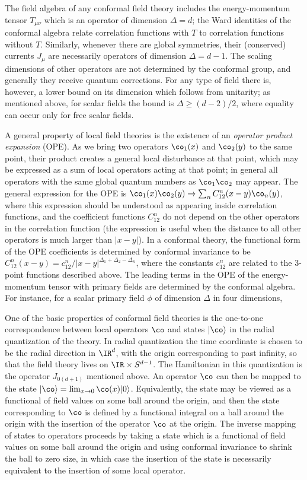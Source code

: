 The field algebra of any conformal field theory includes the
energy-momentum tensor $T_{\mu\nu}$ which is an operator of dimension
$\Delta=d$; the Ward identities of the conformal algebra relate
correlation functions with $T$ to correlation functions without
$T$. Similarly, whenever there are global symmetries, their
(conserved) currents $J_\mu$ are necessarily operators of dimension
$\Delta=d-1$. The scaling dimensions of other operators are not
determined by the conformal group, and generally they receive quantum
corrections. For any type of field there is, however, a lower bound on
its dimension which follows from unitarity; as mentioned above, for
scalar fields the bound is $\Delta \geq (d-2)/2$, where equality can
occur only for free scalar fields.

A general property of local field theories is the existence of an {\it
operator product expansion} (OPE). As we bring two operators
$\co_1(x)$ and $\co_2(y)$ to the same point, their product creates a
general local disturbance at that point, which may be expressed as a
sum of local operators acting at that point; in general all operators
with the same global quantum numbers as $\co_1 \co_2$ may appear. The
general expression for the OPE is $\co_1(x) \co_2(y) \to \sum_n
C_{12}^n(x-y) \co_n(y)$, where this expression should be understood as
appearing inside correlation functions, and the coefficient functions
$C_{12}^n$ do not depend on the other operators in the correlation
function (the expression is useful when the distance to all other
operators is much larger than $|x-y|$). In a conformal theory, the
functional form of the OPE coefficients is determined by conformal
invariance to be $C_{12}^n(x-y) = c_{12}^n /
|x-y|^{\Delta_1+\Delta_2-\Delta_n}$, where the constants $c_{12}^n$
are related to the 3-point functions described above. The leading
terms in the OPE of the energy-momentum tensor with primary fields are
determined by the conformal algebra. For instance, for a scalar
primary field $\phi$ of dimension $\Delta$ in four dimensions,

One of the basic properties of conformal field theories is the
one-to-one correspondence between local operators $\co$ and states
$|\co \rangle$ in the radial quantization of the theory. In radial
quantization the time coordinate is chosen to be the radial direction
in $\IR^d$, with the origin corresponding to past infinity, so that
the field theory lives on $\IR \times S^{d-1}$. The Hamiltonian in
this quantization is the operator $J_{0(d+1)}$ mentioned above. An
operator $\co$ can then be mapped to the state $|\co \rangle =
\lim_{x\to 0} \co(x) |0\rangle$. Equivalently, the state may be viewed
as a functional of field values on some ball around the origin, and
then the state corresponding to $\co$ is defined by a functional
integral on a ball around the origin with the insertion of the
operator $\co$ at the origin. The inverse mapping of states to
operators proceeds by taking a state which is a functional of field
values on some ball around the origin and using conformal invariance
to shrink the ball to zero size, in which case the insertion of the
state is necessarily equivalent to the insertion of some local
operator.

